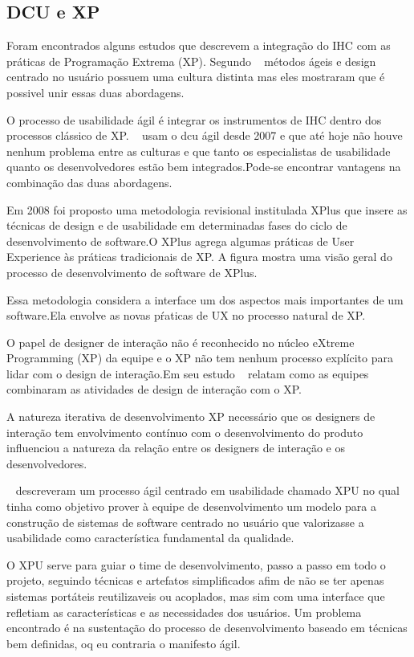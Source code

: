 \subsection {DCU e XP}

	Foram encontrados alguns estudos que descrevem a integração do IHC com as práticas de Programação Extrema (XP). Segundo ~ métodos ágeis e design centrado no usuário possuem uma cultura distinta mas eles mostraram que é possivel unir essas duas abordagens.

	O processo de usabilidade ágil é integrar os instrumentos de IHC dentro dos processos clássico de XP. ~ usam o dcu ágil desde 2007 e que até hoje não houve nenhum problema entre as culturas e que tanto os especialistas de usabilidade quanto os desenvolvedores estão bem integrados.Pode-se encontrar vantagens na combinação das duas abordagens. 

	Em 2008 foi proposto uma metodologia revisional institulada XPlus que insere as técnicas de design e de usabilidade em determinadas fases do ciclo de desenvolvimento de software.O XPlus agrega algumas práticas de User Experience às práticas tradicionais de XP. A figura mostra uma visão geral do processo de desenvolvimento de software de XPlus.


	Essa metodologia considera a interface um dos aspectos mais importantes de um software.Ela envolve as novas pŕaticas de UX no processo natural de XP.

	O papel de designer de interação não é reconhecido no núcleo eXtreme Programming (XP) da equipe e o XP não tem nenhum processo explícito para lidar com o design de interação.Em seu estudo ~ relatam como as equipes combinaram as atividades de design de interação com o XP. 

	A natureza iterativa de desenvolvimento XP necessário que os designers de interação tem envolvimento contínuo com o desenvolvimento do produto influenciou a natureza da relação entre os designers de interação e os desenvolvedores.

	~ descreveram um processo ágil centrado em usabilidade chamado XPU no qual tinha como objetivo prover à equipe de desenvolvimento um modelo para a construção de sistemas de software centrado no usuário que valorizasse a usabilidade como característica fundamental da qualidade. 

	O XPU serve para guiar o time de desenvolvimento, passo a passo em todo o projeto, seguindo técnicas e artefatos simplificados afim de não se ter apenas sistemas portáteis reutilizaveis ou acoplados, mas sim com uma interface que refletiam as características e as necessidades dos usuários. Um problema encontrado é na sustentação do processo de desenvolvimento baseado em técnicas bem definidas, oq eu contraria o manifesto ágil.

